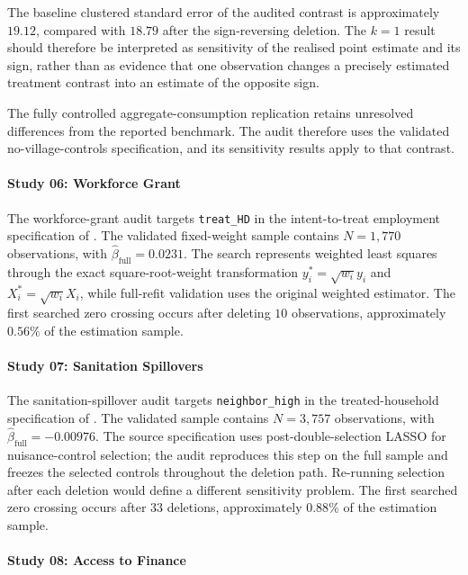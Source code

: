 \documentclass[../main.tex]{subfiles}
\begin{document}
The baseline clustered standard error of the audited contrast is approximately \(19.12\), compared with \(18.79\) after the sign-reversing deletion. The \(k=1\) result should therefore be interpreted as sensitivity of the realised point estimate and its sign, rather than as evidence that one observation changes a precisely estimated treatment contrast into an estimate of the opposite sign.

The fully controlled aggregate-consumption replication retains unresolved differences from the reported benchmark. The audit therefore uses the validated no-village-controls specification, and its sensitivity results apply to that contrast.

\paragraph*{Study 06: Workforce Grant}

The workforce-grant audit targets \texttt{treat\_HD} in the intent-to-treat employment specification of \textcite{mcintosh2022using}. The validated fixed-weight sample contains \(N=1{,}770\) observations, with \(\widehat{\beta}_{\mathrm{full}}=0.0231\). The search represents weighted least squares through the exact square-root-weight transformation \(y_i^*=\sqrt{w_i}y_i\) and \(X_i^*=\sqrt{w_i}X_i\), while full-refit validation uses the original weighted estimator. The first searched zero crossing occurs after deleting \(10\) observations, approximately \(0.56\%\) of the estimation sample.

\paragraph*{Study 07: Sanitation Spillovers}

The sanitation-spillover audit targets \texttt{neighbor\_high} in the treated-household specification of \textcite{deutschmann2024spillovers}. The validated sample contains \(N=3{,}757\) observations, with \(\widehat{\beta}_{\mathrm{full}}=-0.00976\). The source specification uses post-double-selection LASSO for nuisance-control selection; the audit reproduces this step on the full sample and freezes the selected controls throughout the deletion path. Re-running selection after each deletion would define a different sensitivity problem. The first searched zero crossing occurs after \(33\) deletions, approximately \(0.88\%\) of the estimation sample.

\paragraph*{Study 08: Access to Finance}
\end{document}
